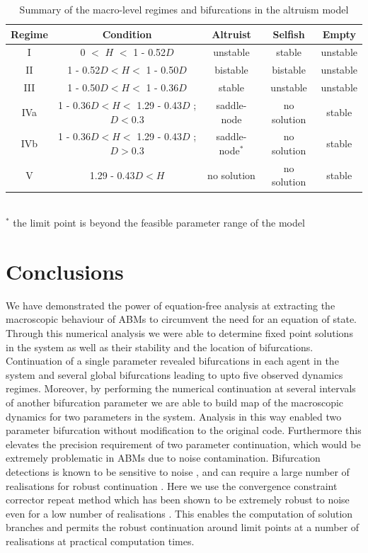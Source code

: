 \documentclass[11pt]{article}
\begin{document}
\begin{table}
\centering
\caption{Summary of the macro-level regimes and bifurcations in the altruism model \label{tab:regime}}
\begin{tabular}{|c|c|c|c|c|}
\hline
Regime & Condition & Altruist & Selfish & Empty \\
\hline
I & 0 $<$ $H$ $<$ 1 - 0.52$D$ & unstable & stable & unstable \\
II & 1 - 0.52$D < H < $ 1 - 0.50$D$  & bistable & bistable & unstable \\
III & 1 - 0.50$D < H < $ 1 - 0.36$D$  & stable & unstable & unstable \\
IVa &  1 - 0.36$D < H < $ 1.29 - 0.43$D$  ; $D<$0.3 & saddle-node & no solution & stable \\
IVb &  1 - 0.36$D < H < $ 1.29 - 0.43$D$  ; $D>$0.3 & saddle-node$^*$ & no solution & stable \\
V & 1.29 - 0.43$D < H $ & no solution & no solution & stable\\
\hline
\end{tabular}\\
$^*$ the limit point is beyond the feasible parameter range of the model
\end{table}





\section{Conclusions}

We have demonstrated the power of equation-free analysis at extracting the macroscopic behaviour of ABMs to circumvent the need for an equation of state. Through this numerical analysis we were able to determine fixed point solutions in the system as well as their stability and the location of bifurcations. Continuation of a single parameter revealed bifurcations in each agent in the system and several global bifurcations leading to upto five observed dynamics regimes. Moreover, by performing the numerical continuation at several intervals of another bifurcation parameter we are able to build map of the macroscopic dynamics for two parameters in the system. Analysis in this way enabled two parameter bifurcation without modification to the original code. Furthermore this elevates the precision requirement of two parameter continuation, which would be extremely problematic in ABMs due to noise contamination. Bifurcation detections is known to be sensitive to noise \cite{Kevrekidis?}, and can require a large number of realisations for robust continuation \cite{}. Here we use the convergence constraint corrector repeat method which has been shown to be extremely robust to noise even for a low number of realisations \cite{Thomas2016ember}. This enables the computation of solution branches and permits the robust continuation around limit points at a number of realisations at practical computation times. 
\end{document}
